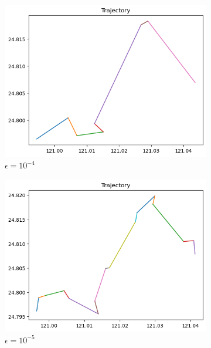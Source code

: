 \documentclass[12pt, a4paper]{article}
\begin{document}
\begin{figure}[h]
\centering
\begin{subfigure}{.45\linewidth}
\includegraphics[width=\linewidth]{q5_a}
\caption{$\epsilon=10^{-4}$}
\end{subfigure}
\begin{subfigure}{.45\linewidth}
\includegraphics[width=\linewidth]{q5_b}
\caption{$\epsilon=10^{-5}$}
\end{subfigure}
\begin{subfigure}{.45\linewidth}

\end{subfigure}
\end{figure}
\end{document}
